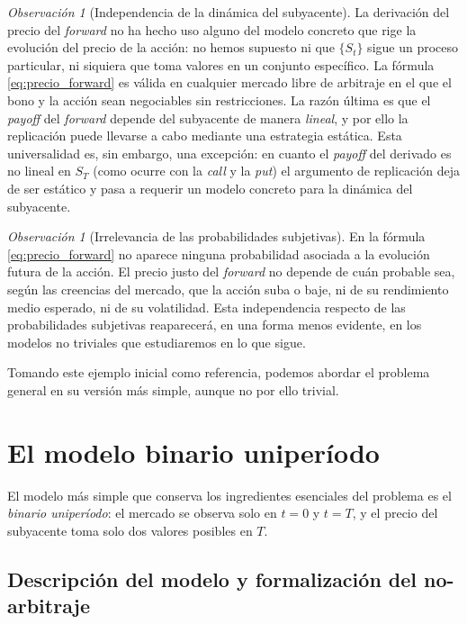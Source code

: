 \documentclass[11pt,a4paper,oneside]{report}
\theoremstyle{plain}
\theoremstyle{definition}
\theoremstyle{remark}
\newtheorem{observacion}[teorema]{Observación}
\newcommand{\1}{\mathbf{1}}
\begin{document}
\begin{observacion}[Independencia de la dinámica del subyacente]
La derivación del precio del \emph{forward} no ha hecho uso alguno del
modelo concreto que rige la evolución del precio de la acción: no hemos
supuesto ni que $\{S_t\}$ sigue un proceso particular, ni siquiera que
toma valores en un conjunto específico. La fórmula
\eqref{eq:precio_forward} es válida en cualquier mercado libre de
arbitraje en el que el bono y la acción sean negociables sin
restricciones. La razón última es que el \emph{payoff} del
\emph{forward} depende del subyacente de manera \emph{lineal}, y por
ello la replicación puede llevarse a cabo mediante una estrategia
estática. Esta universalidad es, sin embargo, una excepción: en cuanto
el \emph{payoff} del derivado es no lineal en $S_T$ (como ocurre con la
\emph{call} y la \emph{put}) el argumento de replicación deja de ser
estático y pasa a requerir un modelo concreto para la dinámica del
subyacente.
\end{observacion}

\begin{observacion}[Irrelevancia de las probabilidades subjetivas]
En la fórmula \eqref{eq:precio_forward} no aparece ninguna probabilidad
asociada a la evolución futura de la acción. El precio justo del
\emph{forward} no depende de cuán probable sea, según las creencias del
mercado, que la acción suba o baje, ni de su rendimiento medio
esperado, ni de su volatilidad. Esta independencia respecto de las
probabilidades subjetivas reaparecerá, en una forma menos evidente, en los
modelos no triviales que estudiaremos en lo que sigue.
\end{observacion}

Tomando este ejemplo inicial como referencia, podemos abordar el
problema general en su versión más simple, aunque no por ello trivial.

\section{El modelo binario uniperíodo}
\label{sec:binario}

El modelo más simple que conserva los ingredientes esenciales del
problema es el \emph{binario uniperíodo}: el mercado se observa solo
en $t = 0$ y $t = T$, y el precio del subyacente toma solo dos
valores posibles en $T$.

\subsection{Descripción del modelo y formalización del no-arbitraje}
\label{subsec:setup_binario}
\end{document}
